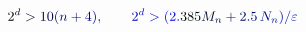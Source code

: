 \documentclass[12pt]{article}
\begin{document}
\makeatletter
\renewcommand*{\@textcolor}[3]{%
  \protect\leavevmode
  \begingroup
    \color#1{#2}#3%
  \endgroup
}
\makeatother
\begin{displaymath}
\mathcolor[RGB]{0,0,15}{2} ^ { \mathcolor[RGB]{0,0,30}{d} } \mathcolor[RGB]{0,0,45}{>} \mathcolor[RGB]{0,0,60}{1} \mathcolor[RGB]{0,0,75}{0} \mathcolor[RGB]{0,0,90}{(} \mathcolor[RGB]{0,0,105}{n} \mathcolor[RGB]{0,0,120}{+} \mathcolor[RGB]{0,0,135}{4} \mathcolor[RGB]{0,0,150}{)} \mathcolor[RGB]{0,0,165}{,} \qquad \mathcolor[RGB]{0,0,180}{2} ^ { \mathcolor[RGB]{0,0,195}{d} } \mathcolor[RGB]{0,0,210}{>} \mathcolor[RGB]{0,0,225}{(} \mathcolor[RGB]{0,0,240}{2} \mathcolor[RGB]{0,0,255}{.} \mathcolor[RGB]{0,15,0}{3} \mathcolor[RGB]{0,15,15}{8} \mathcolor[RGB]{0,15,30}{5} \mathcolor[RGB]{0,15,45}{M} _ { \mathcolor[RGB]{0,15,60}{n} } \mathcolor[RGB]{0,15,75}{+} \mathcolor[RGB]{0,15,90}{2} \mathcolor[RGB]{0,15,105}{.} \mathcolor[RGB]{0,15,120}{5} \, \mathcolor[RGB]{0,15,135}{N} _ { \mathcolor[RGB]{0,15,150}{n} } \mathcolor[RGB]{0,15,165}{)} \mathcolor[RGB]{0,15,180}{/} \mathcolor[RGB]{0,15,195}{\varepsilon}
\end{displaymath}
\end{document}
